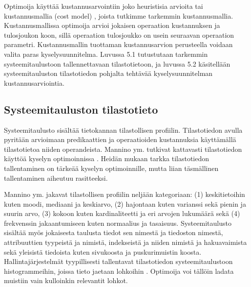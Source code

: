 \documentclass[finnish]{tktltiki2}
\theoremstyle{definition}
\theoremstyle{remark}
\begin{document}
Optimoija käyttää kustannusarvointiin joko heuristisia arvioita tai kustannusmallia (cost model) \cite{jarke1984}, joista tutkimme tarkemmin kustannusmallia. Kustannusmallissa optimoija arvioi jokaisen operaation kustannuksen ja tulosjoukon koon, sillä operaation tulosjoukko on usein seuraavan operaation parametri. Kustannusmallin tuottaman kustannusarvion perusteella voidaan valita paras kyselysuunnitelma. Luvussa 5.1 tutustutaan tarkemmin systeemitaulustoon tallennettavaan tilastotietoon, ja luvussa 5.2 käsitellään systeemitauluston tilastotiedon pohjalta tehtävää kyselysuunnitelman kustannusarviointia.


\subsection{Systeemitauluston tilastotieto}
Systeemitaulusto sisältää tietokannan tilastollisen profiilin. Tilastotiedon avulla pyritään arvioimaan predikaattien ja operaatioiden kustannuksia käyttämällä tilastotietoa niiden operandeista. Mannino ym. tutkivat kattavasti tilastotiedon käyttöä kyselyn optimoinnissa \cite{mannino1988statistical}. Heidän mukaan tarkka tilastotiedon tallentaminen on tärkeää kyselyn optimoinnille, mutta liian täsmällinen tallentaminen aiheutuu rasitteeksi.

Mannino ym. jakavat tilastollisen profiilin neljään kategoriaan: (1) keskitietoihin kuten moodi, mediaani ja keskiarvo,  (2) hajontaan kuten varianssi sekä pienin ja suurin arvo, (3) kokoon kuten kardinaliteetti ja eri arvojen lukumäärä sekä (4) frekvenssin jakaantumiseen kuten normaalius ja tasaisuus. Systeemitaulusto sisältää myös jokaisesta taulusta tiedot sen nimestä ja tiedoston nimestä,  attribuuttien tyypeistä ja nimistä, indekseistä ja niiden nimistä ja hakuavaimista sekä yleisistä tiedoista kuten sivukoosta ja puskurimuistin koosta. Hallintajärjestelmät tyypillisesti tallentavat tilastotiedon systeemitaulustoon histogrammeihin, joissa tieto jaetaan lohkoihin \cite{chaudhuri1998}. Optimoija voi tällöin ladata muistiin vain kulloinkin relevantit lohkot. %
\end{document}
